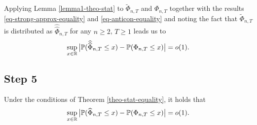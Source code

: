 \documentclass[a4paper,12pt]{article}
\newcommand{\doublehattwo}[1]{\widehat{\widehat{#1}}}
\begin{document}
Applying Lemma \ref{lemma1-theo-stat} to $\widetilde{\Phi}_{n, T}$ and $\Phi_{n,T}$ together with the results \eqref{eq-strong-approx-equality} and \eqref{eq-anticon-equality} and noting the fact that $\widetilde{\Phi}_{n, T}$ is distributed as $\doublehattwo{\Phi}_{n, T}$ for any $n \ge 2$, $T \ge 1$ leads us to
\begin{equation*}\label{eq-}
\sup_{x \in \reals} \big| \pr(\doublehattwo{\Phi}_{n, T} \le x) - \pr(\Phi_{n,T} \le x) \big| = o(1). 
\end{equation*}

\subsection*{Step 5}
\begin{propA}\label{propA-gaussian-relation}
Under the conditions of Theorem \ref{theo-stat-equality}, it holds that 
\begin{equation}\label{eq-relation-gaussian}
\sup_{x \in \mathbb{R}} \big| \mathbb{P}(\widehat{\Phi}_{n, T} \le x) - \mathbb{P}(\Phi_{n,T} \le x) \big| = o(1).
\end{equation}
\end{propA}
\end{document}
